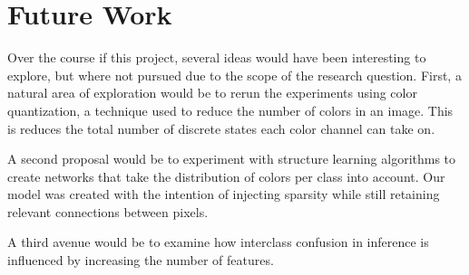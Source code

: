 \documentclass{article}
\begin{document}

\section{Future Work}
Over the course if this project, several ideas would have been interesting to
explore, but where not pursued due to the scope of the research question. First,
a natural area of exploration would be to rerun the experiments using color
quantization, a technique used to reduce the number of colors in an image. This
is reduces the total number of discrete states each color channel can take on.

A second proposal would be to experiment with structure learning algorithms to
create networks that take the distribution of colors per class into account.
Our model was created with the intention of injecting sparsity while still
retaining relevant connections between pixels.

A third avenue would be to examine how interclass confusion in inference
is influenced by increasing the number of features.









\end{document}

